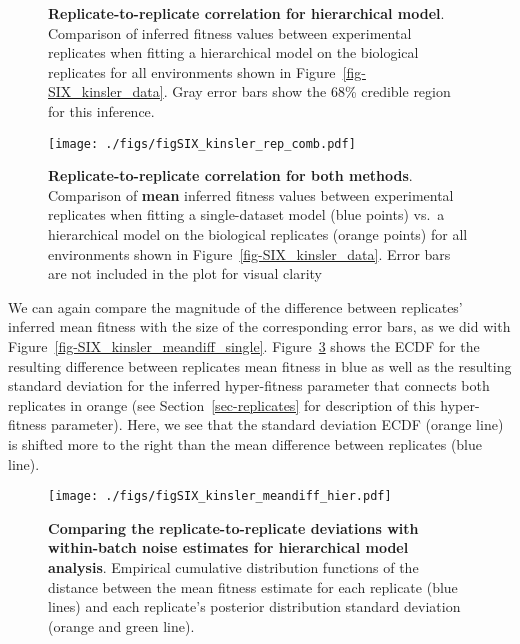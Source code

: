 \documentclass[
]{scrartcl}
\begin{document}
\begin{refsegment}
\begin{figure}
{}

\caption{\label{fig-SIX_kinsler_rep_hier}\textbf{Replicate-to-replicate
correlation for hierarchical model}. Comparison of inferred fitness
values between experimental replicates when fitting a hierarchical model
on the biological replicates for all environments shown in
Figure~\ref{fig-SIX_kinsler_data}. Gray error bars show the 68\%
credible region for this inference.}

\end{figure}

\begin{figure}

{\centering \texttt{[image: ./figs/figSIX\_kinsler\_rep\_comb.pdf]}

}

\caption{\label{fig-SIX_kinsler_rep_comb}\textbf{Replicate-to-replicate
correlation for both methods}. Comparison of \textbf{mean} inferred
fitness values between experimental replicates when fitting a
single-dataset model (blue points) vs.~a hierarchical model on the
biological replicates (orange points) for all environments shown in
Figure~\ref{fig-SIX_kinsler_data}. Error bars are not included in the
plot for visual clarity}

\end{figure}

We can again compare the magnitude of the difference between replicates'
inferred mean fitness with the size of the corresponding error bars, as
we did with Figure~\ref{fig-SIX_kinsler_meandiff_single}.
Figure~\ref{fig-SIX_kinsler_meandiff_hier} shows the ECDF for the
resulting difference between replicates mean fitness in blue as well as
the resulting standard deviation for the inferred hyper-fitness
parameter that connects both replicates in orange (see
Section~\ref{sec-replicates} for description of this hyper-fitness
parameter). Here, we see that the standard deviation ECDF (orange line)
is shifted more to the right than the mean difference between replicates
(blue line).

\begin{figure}

{\centering \texttt{[image: ./figs/figSIX\_kinsler\_meandiff\_hier.pdf]}

}

\caption{\label{fig-SIX_kinsler_meandiff_hier}\textbf{Comparing the
replicate-to-replicate deviations with within-batch noise estimates for
hierarchical model analysis}. Empirical cumulative distribution
functions of the distance between the mean fitness estimate for each
replicate (blue lines) and each replicate's posterior distribution
standard deviation (orange and green line).}


\end{figure}
\end{refsegment}
\end{document}
